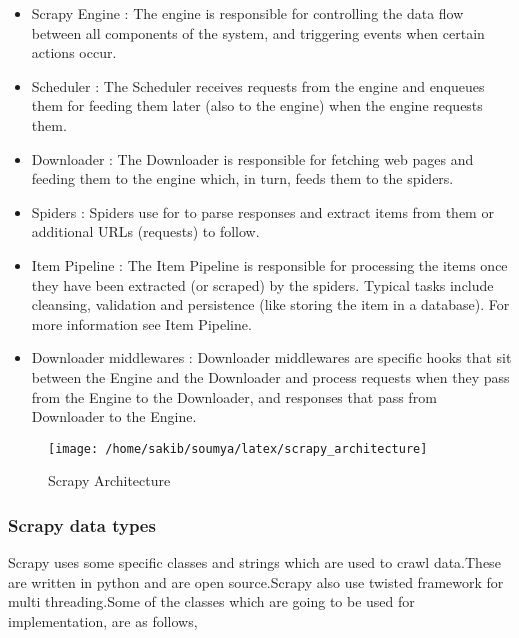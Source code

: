 \begin{itemize}
\item Scrapy Engine :
The engine is responsible for controlling the data flow between all components of the system, and triggering events when certain actions occur. 

\item Scheduler :
The Scheduler receives requests from the engine and enqueues them for feeding them later (also to the engine) when the engine requests them.

\item Downloader :
The Downloader is responsible for fetching web pages and feeding them to the engine which, in turn, feeds them to the spiders.

\item Spiders :
Spiders use for to parse responses and extract items from them or additional URLs (requests) to follow.

\item Item Pipeline :
The Item Pipeline is responsible for processing the items once they have been extracted (or scraped) by the spiders. Typical tasks include cleansing, validation and persistence (like storing the item in a database). For more information see Item Pipeline.

\item Downloader middlewares :
Downloader middlewares are specific hooks that sit between the Engine and the Downloader and process requests when they pass from the Engine to the Downloader, and responses that pass from Downloader to the Engine.

\end{itemize}
\begin{figure}[h]
\texttt{[image: /home/sakib/soumya/latex/scrapy\_architecture]}
\centering
\caption{Scrapy Architecture}
\end{figure}

\subsubsection{Scrapy data types}
Scrapy uses some specific classes and strings which are used to crawl data.These are written in python and are open source.Scrapy also use twisted framework for multi threading.Some of the classes which are going to be used for implementation, are as follows,

